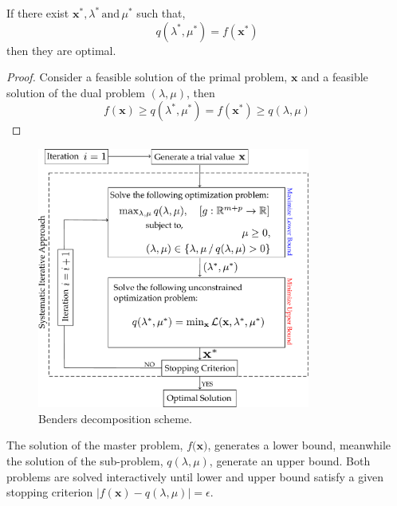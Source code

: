 \begin{corollary}{}{}
If there exist $\textbf{x}^{*},\lambda^{*}\,\text{and}\, \mu^{*}$ such that,
\begin{equation}
    q(\lambda^{*}, \mu^{*}) = f(\textbf{x}^{*})
\end{equation}
then they are optimal.
\end{corollary}
\begin{proof}
Consider a feasible solution of the primal problem, $\textbf{x}$ and a feasible solution of the dual problem $(\lambda, \mu)$, then
\begin{equation}
    f(\textbf{x}) \geq q(\lambda^{*}, \mu^{*}) = f(\textbf{x}^{*}) \geq q(\lambda, \mu)
\end{equation}
\end{proof}
\begin{figure}[H]
\includegraphics[width=0.8\textwidth]{Figures/BDScheme.pdf} 
\caption{Benders decomposition scheme.}
\label{fig:BDScheme}
\end{figure}
The solution of the master problem, $f(\textbf{x)}$, generates a lower bound, meanwhile the solution of the sub-problem, $q(\lambda, \mu)$, generate an upper bound. Both problems are solved interactively until lower and upper bound satisfy a given stopping criterion $|f(\textbf{x}) - q(\lambda, \mu)| = \epsilon$.\\\\
